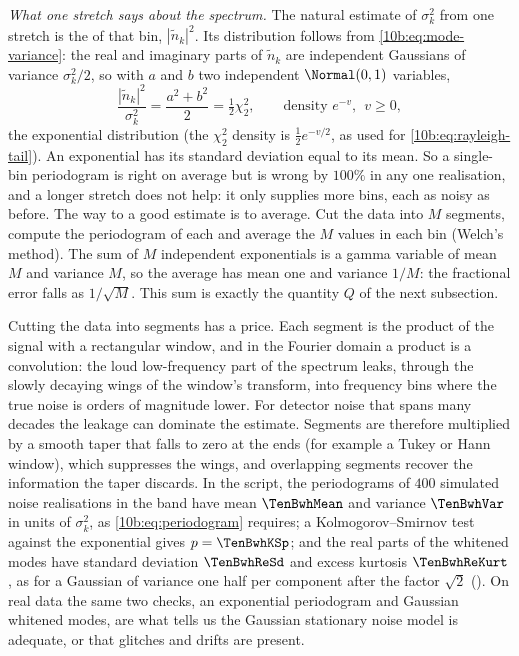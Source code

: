\emph{What one stretch says about the spectrum.} The natural estimate of $\sigma_k^2$ from one stretch is the
 of that bin, $|\tilde n_k|^2$. Its distribution follows from \eqref{10b:eq:mode-variance}: the real
and imaginary parts of $\tilde n_k$ are independent Gaussians of variance $\sigma_k^2/2$, so with $a$ and $b$ two
independent $\Normal(0,1)$ variables,
\begin{equation}
  \frac{|\tilde n_k|^2}{\sigma_k^2}=\frac{a^2+b^2}{2}=\tfrac12\chi^2_2,
  \qquad\text{density }e^{-v},\ \ v\ge0,
  \label{10b:eq:periodogram}
\end{equation}
the exponential distribution (the $\chi^2_2$ density is $\tfrac12e^{-v/2}$, as used for \eqref{10b:eq:rayleigh-tail}).
An exponential has its standard deviation equal to its mean. So a single-bin periodogram is right on average but is
wrong by $100\%$ in any one realisation, and a longer stretch does not help: it only supplies more bins, each as noisy as
before. The way to a good estimate is to average. Cut the data into $M$ segments, compute the periodogram of each
and average the $M$ values in each bin (Welch's method). The sum of $M$ independent exponentials is a gamma
variable of mean $M$ and variance $M$, so the average has mean one and variance $1/M$: the fractional error falls as
$1/\sqrt M$. This sum is exactly the quantity $Q$ of the next subsection.

Cutting the data into segments has a price. Each segment is the product of the signal with a rectangular window, and in
the Fourier domain a product is a convolution: the loud low-frequency part of the spectrum leaks, through the slowly
decaying wings of the window's transform, into frequency bins where the true noise is orders of magnitude lower. For
detector noise that spans many decades the leakage can dominate the estimate. Segments are therefore multiplied by a
smooth taper that falls to zero at the ends (for example a Tukey or Hann window), which suppresses the wings, and
overlapping segments recover the information the taper discards. In the script,
the periodograms of $400$ simulated noise realisations in the band have mean $\TenBwhMean$ and variance
$\TenBwhVar$ in units of $\sigma_k^2$, as \eqref{10b:eq:periodogram} requires; a Kolmogorov--Smirnov test against the
exponential gives $p=\TenBwhKSp$; and the real parts of the whitened modes have standard deviation $\TenBwhReSd$ and
excess kurtosis $\TenBwhReKurt$, as for a Gaussian of variance one half per component after the factor $\sqrt2$
(). On real data the same two checks, an exponential periodogram and Gaussian
whitened modes, are what tells us the Gaussian stationary noise model is adequate, or that glitches and drifts are
present.

